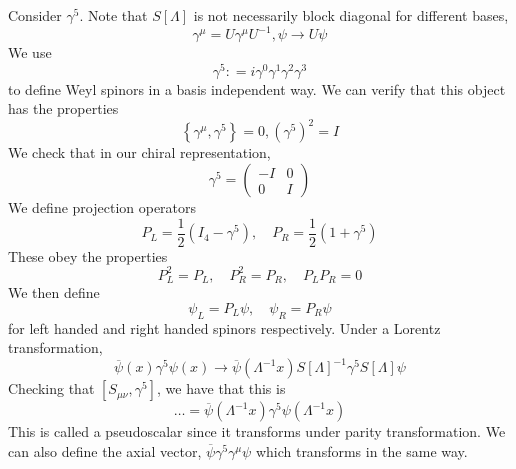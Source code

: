 Consider $ \gamma ^ 5 $. 
Note that  $ S [ \Lambda ] $ is not necessarily block diagonal 
for different bases, 
\[
 \gamma ^ \mu = U \gamma ^ \mu U ^{ - 1 }, \psi \to U \psi 
\] We use 
\[
 \gamma ^{ 5 }  : = i \gamma ^ 0 \gamma ^ 1 \gamma ^ 2 \gamma ^ 3 
\]  to define Weyl spinors in a basis independent way. 
We can verify that this object has the properties 
\[
	\left\{  \gamma ^ \mu , \gamma ^ 5 \right\}   = 0 , \left(  \gamma ^ 5  \right)  ^ 2 = I 
\] We check that in our chiral representation, 
\[
	\gamma ^ 5 = \begin{pmatrix}  - I & 0 \\ 0 & I  \end{pmatrix} 
\] We define projection operators 
\[
	P _ L = \frac{1}{2 } ( I _ 4 - \gamma ^ 5 ) , \quad P _ R = \frac{1}{2 } ( 1 + \gamma ^ 5 ) 
\] These obey the properties 
\[
 P_ L ^ 2 = P_L , \quad P _ R ^ 2 = P _ R , \quad P _ L P _ R = 0 
\] We then define 
\[
 \psi _ L = P_L \psi , \quad \psi _ R = P _ R \psi 
\] for left handed and right handed spinors respectively. 
Under a Lorentz transformation, 
\[
	\overline{ \psi } ( x) \gamma ^ 5 \psi ( x) \to \overline{ \psi } ( \Lambda ^{ - 1} x ) 
	S [ \Lambda ] ^{ - 1} \gamma ^ 5 S [ \Lambda ] \psi 
\] Checking that $ [ S_{ \mu\nu } , \gamma ^ 5 ] $, we have that 
this is 
\[
	\dots = \overline{ \psi } ( \Lambda ^{ -1 } x ) \gamma ^ 5 \psi ( \Lambda ^{ - 1} x ) 
\] This is called a pseudoscalar since it transforms under 
parity transformation. We can also define the axial vector, $ \overline{ \psi } \gamma ^ 5 \gamma ^ \mu 
\psi $ which transforms in the same way. 

